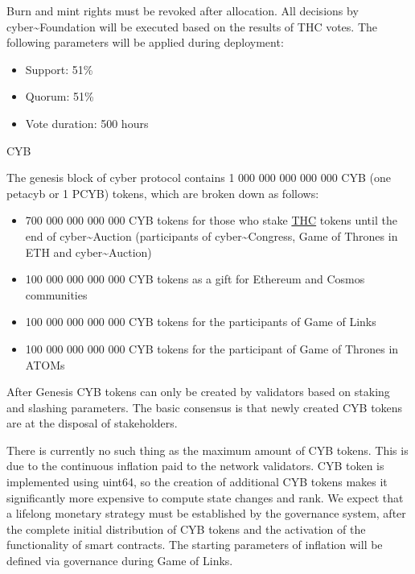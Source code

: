 \documentclass[8pt,oneside]{amsart}
\makeatletter
\renewcommand\subsection{\@startsection{subsection}
                                    {2}{\z@}
                                    {-3.25ex\@plus -1ex \@minus -.2ex}
                                    {0ex \@plus .2ex}
                                    {\play\Large}
                        }
\newcommand{\titleSection}[1]{\subsection{#1}}
\newenvironment{Figure}
  {\par\medskip\noindent\minipage{\linewidth}}
  {\endminipage\par\medskip}
\makeatother
\begin{document}
\begin{Figure}
 \centering
 
\end{Figure}

Burn and mint rights must be revoked after allocation. All decisions by cyber\~{}Foundation will be executed based on the results of THC votes. The following parameters will be applied during deployment:

\begin{itemize}
\item Support: 51\%
\item Quorum: 51\%
\item Vote duration: 500 hours
\end{itemize}

\titleSection{CYB}\label{cyb}

The genesis block of cyber protocol contains 1 000 000 000 000 000 CYB (one petacyb or 1 PCYB) tokens, which are broken down as follows:

\begin{itemize}
\item 700 000 000 000 000 CYB tokens for those who stake {\hyperref[thc]{THC}} tokens until the end of cyber\~{}Auction (participants of cyber\~{}Congress, Game of Thrones in ETH and cyber\~{}Auction)
\item 100 000 000 000 000 CYB tokens as a gift for Ethereum and Cosmos communities
\item 100 000 000 000 000 CYB tokens for the participants of Game of Links
\item 100 000 000 000 000 CYB tokens for the participant of Game of Thrones in ATOMs
\end{itemize}

\begin{Figure}
 \centering
 
\end{Figure}

After Genesis CYB tokens can only be created by validators based on staking and slashing parameters. The basic consensus is that newly created CYB tokens are at the disposal of stakeholders.

There is currently no such thing as the maximum amount of CYB tokens. This is due to the continuous inflation paid to the network validators. CYB token is implemented using uint64, so the creation of additional CYB tokens makes it significantly more expensive to compute state changes and rank. We expect that a lifelong monetary strategy must be established by the governance system, after the complete initial distribution of CYB tokens and the activation of the functionality of smart contracts. The starting parameters of inflation will be defined via governance during Game of Links.
\end{document}

